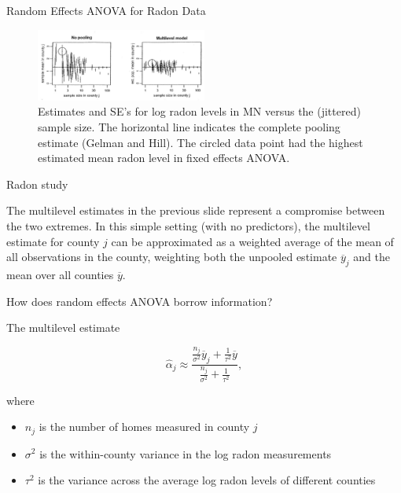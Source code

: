 \documentclass[ignorenonframetext,]{beamer}
\begin{document}
\begin{frame}{Random Effects ANOVA for Radon Data}

\begin{figure}
\centering
\includegraphics[width=0.50000\textwidth]{figures/gelman1.jpg}
\caption{Estimates and SE's for log radon levels in MN versus the
(jittered) sample size. The horizontal line indicates the complete
pooling estimate (Gelman and Hill). The circled data point had the
highest estimated mean radon level in fixed effects ANOVA.}
\end{figure}

\end{frame}

\begin{frame}{Radon study}

The multilevel estimates in the previous slide represent a compromise
between the two extremes. In this simple setting (with no predictors),
the multilevel estimate for county \(j\) can be approximated as a
weighted average of the mean of all observations in the county,
weighting both the unpooled estimate \(\overline{y}_j\) and the mean
over all counties \(\overline{y}\).

\end{frame}

\begin{frame}{}

How does random effects ANOVA borrow information?

The multilevel estimate

\[\widehat{\alpha}_j \approx
\frac{\frac{n_j}{\sigma^2}\overline{y}_j+\frac{1}{\tau^2}\overline{y}}{\frac{n_j}{\sigma^2}+\frac{1}{\tau^2}},\]

where

\begin{itemize}
\item
  \(n_j\) is the number of homes measured in county \(j\)
\item
  \(\sigma^2\) is the within-county variance in the log radon
  measurements
\item
  \(\tau^2\) is the variance across the average log radon levels of
  different counties
\end{itemize}

\end{frame}
\end{document}
